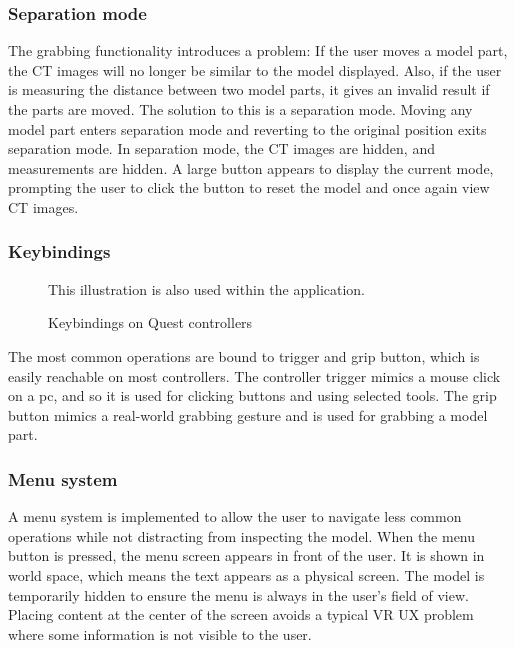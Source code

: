 \documentclass[a4paper]{report}
\begin{document}
\subsubsection{Separation mode}
The grabbing functionality introduces a problem: If the user moves a model part, the CT images will no longer be similar to the model displayed. Also, if the user is measuring the distance between two model parts, it gives an invalid result if the parts are moved. 
The solution to this is a separation mode. Moving any model part enters separation mode and reverting to the original position exits separation mode. In separation mode, the CT images are hidden, and measurements are hidden. A large button appears to display the current mode, prompting the user to click the button to reset the model and once again view CT images.

\subsubsection{Keybindings}

\begin{figure}[h!]
    \centering
	\hfill
  \caption{Keybindings on Quest controllers}
  \small
  This illustration is also used within the application.
\end{figure}

The most common operations are bound to trigger and grip button, which is easily reachable on most controllers. The controller trigger mimics a mouse click on a pc, and so it is used for clicking buttons and using selected tools. The grip button mimics a real-world grabbing gesture and is used for grabbing a model part.

\subsubsection{Menu system}
A menu system is implemented to allow the user to navigate less common operations while not distracting from inspecting the model.
When the menu button is pressed, the menu screen appears in front of the user. It is shown in world space, which means the text appears as a physical screen. The model is temporarily hidden to ensure the menu is always in the user's field of view. Placing content at the center of the screen avoids a typical VR UX problem where some information is not visible to the user.
\end{document}
